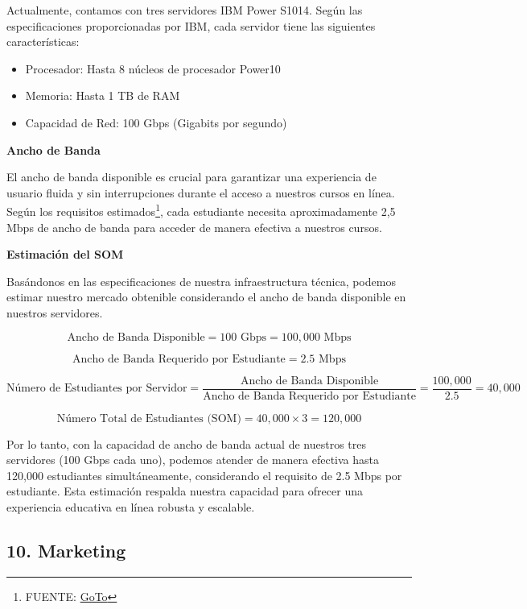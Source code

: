 \documentclass[
]{article}
\begin{document}
Actualmente, contamos con tres servidores IBM Power S1014. Según las
especificaciones proporcionadas por IBM, cada servidor tiene las
siguientes características:

\begin{itemize}
\item
  Procesador: Hasta 8 núcleos de procesador Power10
\item
  Memoria: Hasta 1 TB de RAM
\item
  Capacidad de Red: 100 Gbps (Gigabits por segundo)
\end{itemize}

\textbf{Ancho de Banda}

El ancho de banda disponible es crucial para garantizar una experiencia
de usuario fluida y sin interrupciones durante el acceso a nuestros
cursos en línea. Según los requisitos estimados\footnote{FUENTE:
  \href{https://support.goto.com/es/joinme/help/what-are-the-bandwidth-requirements}{GoTo}},
cada estudiante necesita aproximadamente 2,5 Mbps de ancho de banda para
acceder de manera efectiva a nuestros cursos.

\textbf{Estimación del SOM}

Basándonos en las especificaciones de nuestra infraestructura técnica,
podemos estimar nuestro mercado obtenible considerando el ancho de banda
disponible en nuestros servidores.

\[
\text{Ancho de Banda Disponible} = 100 \text{ Gbps} = 100,000 \text{ Mbps}
\]

\[
\text{Ancho de Banda Requerido por Estudiante} = 2.5 \text{ Mbps}
\]

\[
\text{Número de Estudiantes por Servidor} = \frac{\text{Ancho de Banda Disponible}}{\text{Ancho de Banda Requerido por Estudiante}} = \frac{100,000}{2.5} = 40,000
\]

\[
\text{Número Total de Estudiantes (SOM)} = 40,000 \times 3 = 120,000
\]

Por lo tanto, con la capacidad de ancho de banda actual de nuestros tres
servidores (100 Gbps cada uno), podemos atender de manera efectiva hasta
120,000 estudiantes simultáneamente, considerando el requisito de 2.5
Mbps por estudiante. Esta estimación respalda nuestra capacidad para
ofrecer una experiencia educativa en línea robusta y escalable.

\newpage

\subsection{10. Marketing}\label{marketing}
\end{document}

